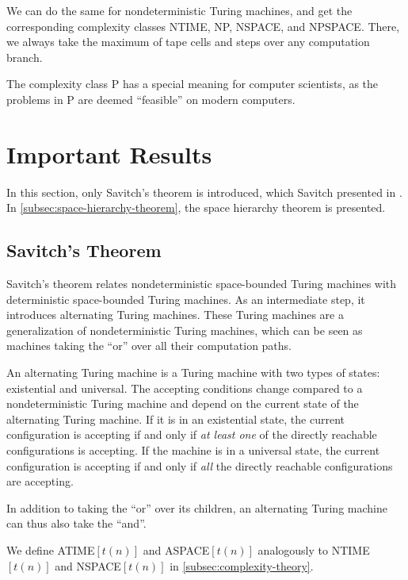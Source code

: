 We can do the same for nondeterministic Turing machines, and get the corresponding complexity classes \acs{NTIME}, \acs{NP}, \acs{NSPACE}, and \acs{NPSPACE}\@.
There, we always take the maximum of tape cells and steps over any computation branch.

The complexity class \acs{P} has a special meaning for computer scientists, as the problems in \acs{P} are deemed ``feasible'' on modern computers.


\section{Important Results}\label{sec:important-results}

In this section, only Savitch's theorem is introduced, which Savitch presented in \cite{Savitch1970}.
In \cref{subsec:space-hierarchy-theorem}, the space hierarchy theorem is presented.

\subsection{Savitch's Theorem}\label{subsec:nspacesubsetdspacesquared}

Savitch's theorem relates nondeterministic space-bounded Turing machines with deterministic space-bounded Turing machines.
As an intermediate step, it introduces alternating Turing machines.
These Turing machines are a generalization of nondeterministic Turing machines, which can be seen as machines taking the ``or'' over all their computation paths.

\begin{define}
    An alternating Turing machine is a Turing machine with two types of states: existential and universal.
    The accepting conditions change compared to a nondeterministic Turing machine and depend on the current state of the alternating Turing machine.
    If it is in an existential state, the current configuration is accepting if and only if \emph{at least one} of the directly reachable configurations is accepting.
    If the machine is in a universal state, the current configuration is accepting if and only if \emph{all} the directly reachable configurations are accepting.
\end{define}

In addition to taking the ``or'' over its children, an alternating Turing machine can thus also take the ``and''.

\sloppy We define \acs{ATIME}$[t(n)]$ and \acs{ASPACE}$[t(n)]$ analogously to \acs{NTIME}$[t(n)]$ and \acs{NSPACE}$[t(n)]$ in \cref{subsec:complexity-theory}.

